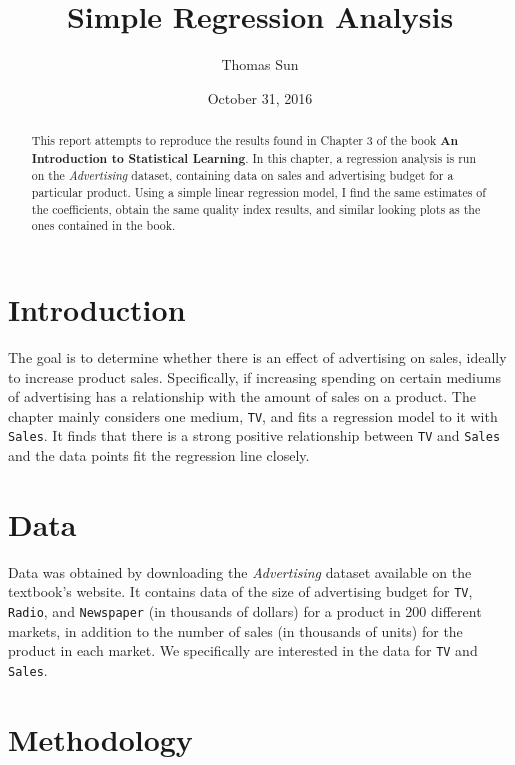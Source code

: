 \documentclass{article}
\title{Simple Regression Analysis}
\author{Thomas Sun}
\date{October 31, 2016}
\begin{document}

\maketitle


\begin{abstract}

This report attempts to reproduce the results found in Chapter 3 of the book \textbf{An Introduction to Statistical Learning}. In this chapter, a regression analysis is run on the \textit{Advertising} dataset, containing data on sales and advertising budget for a particular product. Using a simple linear regression model, I find the same estimates of the coefficients, obtain the same quality index results, and similar looking plots as the ones contained in the book.

\end{abstract}

\section{Introduction}

The goal is to determine whether there is an effect of advertising on sales, ideally to increase product sales. Specifically, if increasing spending on certain mediums of advertising has a relationship with the amount of sales on a product. The chapter mainly considers one medium, \texttt{TV}, and fits a regression model to it with \texttt{Sales}. It finds that there is a strong positive relationship between \texttt{TV} and \texttt{Sales} and the data points fit the regression line closely.

\section{Data}

Data was obtained by downloading the \textit{Advertising} dataset available on the textbook's website. It contains data of the size of advertising budget for \texttt{TV}, \texttt{Radio}, and \texttt{Newspaper} (in thousands of dollars) for a product in 200 different markets, in addition to the number of sales (in thousands of units) for the product in each market. We specifically are interested in the data for \texttt{TV} and \texttt{Sales}.

\section{Methodology}
\end{document}
